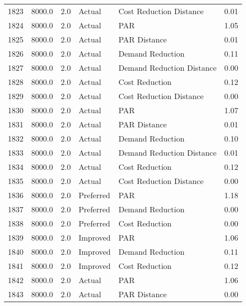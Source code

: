 \begin{longtable}{lrrllr}
1823 &       8000.0 &     2.0 &         Actual &    Cost Reduction Distance &   0.01 \\
1824 &       8000.0 &     2.0 &         Actual &                        PAR &   1.05 \\
1825 &       8000.0 &     2.0 &         Actual &               PAR Distance &   0.01 \\
1826 &       8000.0 &     2.0 &         Actual &           Demand Reduction &   0.11 \\
1827 &       8000.0 &     2.0 &         Actual &  Demand Reduction Distance &   0.00 \\
1828 &       8000.0 &     2.0 &         Actual &             Cost Reduction &   0.12 \\
1829 &       8000.0 &     2.0 &         Actual &    Cost Reduction Distance &   0.00 \\
1830 &       8000.0 &     2.0 &         Actual &                        PAR &   1.07 \\
1831 &       8000.0 &     2.0 &         Actual &               PAR Distance &   0.01 \\
1832 &       8000.0 &     2.0 &         Actual &           Demand Reduction &   0.10 \\
1833 &       8000.0 &     2.0 &         Actual &  Demand Reduction Distance &   0.01 \\
1834 &       8000.0 &     2.0 &         Actual &             Cost Reduction &   0.12 \\
1835 &       8000.0 &     2.0 &         Actual &    Cost Reduction Distance &   0.00 \\
1836 &       8000.0 &     2.0 &      Preferred &                        PAR &   1.18 \\
1837 &       8000.0 &     2.0 &      Preferred &           Demand Reduction &   0.00 \\
1838 &       8000.0 &     2.0 &      Preferred &             Cost Reduction &   0.00 \\
1839 &       8000.0 &     2.0 &       Improved &                        PAR &   1.06 \\
1840 &       8000.0 &     2.0 &       Improved &           Demand Reduction &   0.11 \\
1841 &       8000.0 &     2.0 &       Improved &             Cost Reduction &   0.12 \\
1842 &       8000.0 &     2.0 &         Actual &                        PAR &   1.06 \\
1843 &       8000.0 &     2.0 &         Actual &               PAR Distance &   0.00 \\

\end{longtable}
